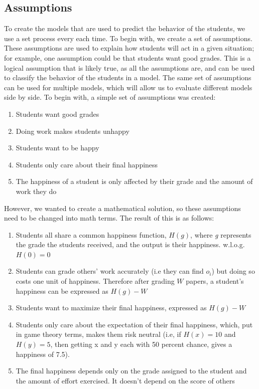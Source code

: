 \documentclass[12pt, Arial]{article}
\begin{document}
\subsection{Assumptions}
To create the models that are used to predict the behavior of the students, we use a set process every each time. To begin with, we create a set of assumptions. These assumptions are used to explain how students will act in a given situation; for example, one assumption could be that students want good grades. This is a logical assumption that is likely true, as all the assumptions are, and can be used to classify the behavior of the students in a model. The same set of assumptions can be used for multiple models, which will allow us to evaluate different models side by side. To begin with, a simple set of assumptions was created:
\begin{enumerate}
	\item Students want good grades
 	\item Doing work makes students unhappy
  	\item Students want to be happy
 	\item Students only care about their final happiness
  	\item The happiness of a student is only affected by their grade and the amount of work they do
\end{enumerate}
However, we wanted to create a mathematical solution, so these assumptions need to be changed into math terms. The result of this is as follows:
\begin{enumerate}
  \item Students all share a common happiness function, $H(g)$, where \emph{g} represents the grade the students received, and the output is their happiness. w.l.o.g. $H(0)=0$
  \item Students can grade others' work accurately (i.e they can find $o_i$) but doing so costs one unit of happiness. Therefore after grading $W$ papers, a student's happiness can be expressed as $H(g)-W$
  \item Students want to maximize their final happiness, expressed as $H(g)-W$
  \item Students only care about the expectation of their final happiness, which, put in game theory terms, makes them risk neutral (i.e, if $H(x)=10$ and $H(y)=5$, then getting x and y each with 50 percent chance, gives a happiness of 7.5).
  \item The final happiness depends only on the grade assigned to the student and the amount of effort exercised. It doesn't depend on the score of others
\end{enumerate}
\end{document}
